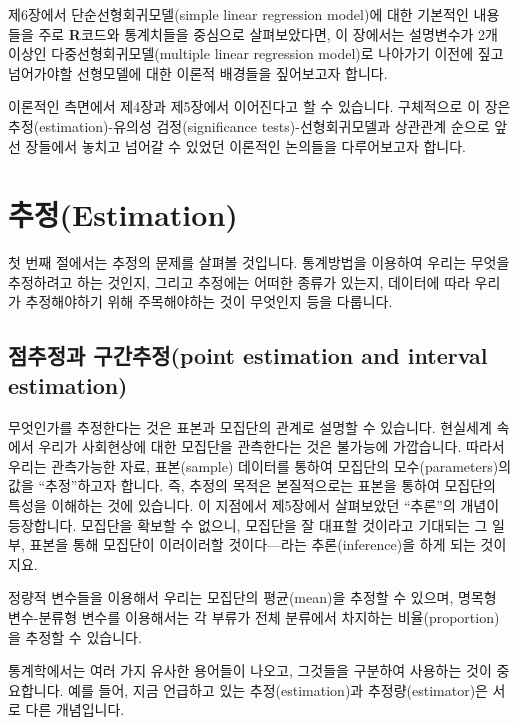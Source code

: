 \documentclass[]{book}
\begin{document}
제6장에서 단순선형회귀모델(simple linear regression model)에 대한 기본적인 내용들을 주로 \textbf{R}코드와 통계치들을 중심으로 살펴보았다면, 이 장에서는 설명변수가 2개 이상인 다중선형회귀모델(multiple linear regression model)로 나아가기 이전에 짚고 넘어가야할 선형모델에 대한 이론적 배경들을 짚어보고자 합니다.

이론적인 측면에서 제4장과 제5장에서 이어진다고 할 수 있습니다. 구체적으로 이 장은 추정(estimation)-유의성 검정(significance tests)-선형회귀모델과 상관관계 순으로 앞선 장들에서 놓치고 넘어갈 수 있었던 이론적인 논의들을 다루어보고자 합니다.

\hypertarget{uxcd94uxc815estimation}{%
\section{추정(Estimation)}\label{uxcd94uxc815estimation}}

첫 번째 절에서는 추정의 문제를 살펴볼 것입니다. 통계방법을 이용하여 우리는 무엇을 추정하려고 하는 것인지, 그리고 추정에는 어떠한 종류가 있는지, 데이터에 따라 우리가 추정해야하기 위해 주목해야하는 것이 무엇인지 등을 다룹니다.

\hypertarget{uxc810uxcd94uxc815uxacfc-uxad6cuxac04uxcd94uxc815point-estimation-and-interval-estimation}{%
\subsection{점추정과 구간추정(point estimation and interval estimation)}\label{uxc810uxcd94uxc815uxacfc-uxad6cuxac04uxcd94uxc815point-estimation-and-interval-estimation}}

무엇인가를 추정한다는 것은 표본과 모집단의 관계로 설명할 수 있습니다. 현실세계 속에서 우리가 사회현상에 대한 모집단을 관측한다는 것은 불가능에 가깝습니다. 따라서 우리는 관측가능한 자료, 표본(sample) 데이터를 통하여 모집단의 모수(parameters)의 값을 ``추정''하고자 합니다. 즉, 추정의 목적은 본질적으로는 표본을 통하여 모집단의 특성을 이해하는 것에 있습니다. 이 지점에서 제5장에서 살펴보았던 ``추론''의 개념이 등장합니다. 모집단을 확보할 수 없으니, 모집단을 잘 대표할 것이라고 기대되는 그 일부, 표본을 통해 모집단이 이러이러할 것이다---라는 추론(inference)을 하게 되는 것이지요.

정량적 변수들을 이용해서 우리는 모집단의 평균(mean)을 추정할 수 있으며, 명목형 변수-분류형 변수를 이용해서는 각 부류가 전체 분류에서 차지하는 비율(proportion)을 추정할 수 있습니다.

통계학에서는 여러 가지 유사한 용어들이 나오고, 그것들을 구분하여 사용하는 것이 중요합니다. 예를 들어, 지금 언급하고 있는 추정(estimation)과 추정량(estimator)은 서로 다른 개념입니다.
\end{document}

